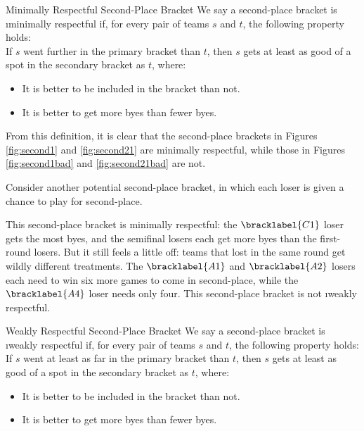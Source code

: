 {    \begin{definition}{Minimally Respectful Second-Place Bracket}{}
        We say a second-place bracket is \i{minimally respectful} if, for every pair of teams $s$ and $t$, the following property holds:\\

        If $s$ went further in the primary bracket than $t$, then $s$ gets at least as good of a spot in the secondary bracket as $t$, where:
        
        \begin{itemize}
            \item It is better to be included in the bracket than not.
            \item It is better to get more byes than fewer byes.
        \end{itemize}
    \end{definition}

    From this definition, it is clear that the second-place brackets in Figures \ref{fig:second1} and \ref{fig:second21} are minimally respectful, while those in Figures \ref{fig:second1bad} and \ref{fig:second21bad} are not.

    Consider another potential second-place bracket, in which each loser is given a chance to play for second-place.


    This second-place bracket is minimally respectful: the $\bracklabel{C1}$ loser gets the most byes, and the semifinal losers each get more byes than the first-round losers. But it still feels a little off: teams that lost in the same round get wildly different treatments. The $\bracklabel{A1}$ and $\bracklabel{A2}$ losers each need to win six more games to come in second-place, while the $\bracklabel{A4}$ loser needs only four. This second-place bracket is not \i{weakly respectful}.

    \begin{definition}{Weakly Respectful Second-Place Bracket}{}
        We say a second-place bracket is \i{weakly respectful} if, for every pair of teams $s$ and $t$, the following property holds:\\

        If $s$ went at least as far in the primary bracket than $t$, then $s$ gets at least as good of a spot in the secondary bracket as $t$, where:
        
        \begin{itemize}
            \item It is better to be included in the bracket than not.
            \item It is better to get more byes than fewer byes.
        \end{itemize}
    \end{definition}

}
